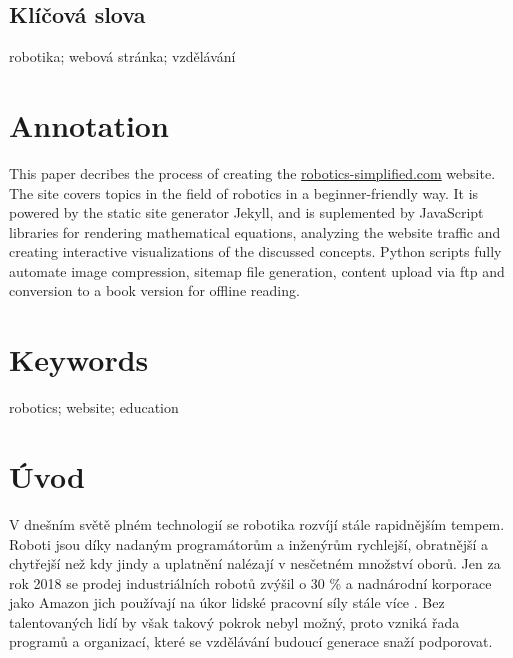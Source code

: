 \documentclass[a4paper, 12pt]{article}
\begin{document}
  \subsection*{\fontsize{18}{21.6}\selectfont\normalfont\textbf{Klíčová slova}}
  robotika; webová stránka; vzdělávání

  \section*{\normalfont\textbf{Annotation}}
  This paper decribes the process of creating the \url{robotics-simplified.com} website. The site covers topics in the field of robotics in a beginner-friendly way. It is powered by the static site generator Jekyll, and is suplemented by JavaScript libraries for rendering mathematical equations, analyzing the website traffic and creating interactive visualizations of the discussed concepts. Python scripts fully automate image compression, sitemap file generation, content upload via \acrshort{ftp} and conversion to a book version for offline reading.

  \section*{\normalfont\textbf{Keywords}}
  robotics; website; education

  \newpage

  \setcounter{savepage}{\value{page}}%

  \tableofcontents

  \newpage

  \section{Úvod}
  V dnešním světě plném technologií se robotika rozvíjí stále rapidnějším tempem. Roboti jsou díky nadaným programátorům a inženýrům rychlejší, obratnější a chytřejší než kdy jindy a uplatnění nalézají v nesčetném množství oborů. Jen za rok 2018 se prodej industriálních robotů zvýšil o 30 \% \cite{industrial-robot-growth} a nadnárodní korporace jako Amazon jich používají na úkor lidské pracovní síly stále více \cite{amazon-hiring}. Bez talentovaných lidí by však takový pokrok nebyl možný, proto vzniká řada programů a organizací, které se vzdělávání budoucí generace snaží podporovat.
\end{document}
